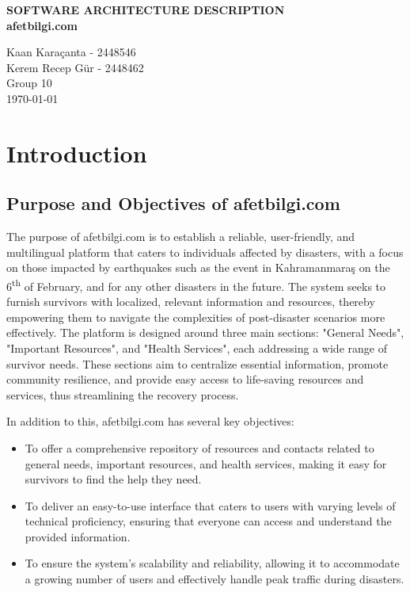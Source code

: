 \documentclass[12pt, letterpaper]{article}
\begin{document}
\begin{titlepage}
    \centering
    \vspace*{\fill}
    \huge
    \textbf{SOFTWARE ARCHITECTURE DESCRIPTION}\\
    \vspace{1cm}
    \textbf{afetbilgi.com}

    \vspace{1cm}
    \large
    Kaan Karaçanta - 2448546 \\
    Kerem Recep Gür - 2448462 \\
    \vspace{1cm}
    Group 10 \\
    \vspace{1cm}
    \today
    \vspace*{\fill}
\end{titlepage}

\tableofcontents
\newpage

\listoffigures
\newpage

\listoftables
\newpage

\section{Introduction}
\subsection{Purpose and Objectives of afetbilgi.com}
The purpose of afetbilgi.com is to establish a reliable, user-friendly, and multilingual platform that caters to individuals affected by disasters, with a focus on those impacted by earthquakes such as the event in Kahramanmaraş on the 6\textsuperscript{th} of February, and for any other disasters in the future. The system seeks to furnish survivors with localized, relevant information and resources, thereby empowering them to navigate the complexities of post-disaster scenarios more effectively.
The platform is designed around three main sections: "General Needs", "Important Resources", and "Health Services", each addressing a wide range of survivor needs. These sections aim to centralize essential information, promote community resilience, and provide easy access to life-saving resources and services, thus streamlining the recovery process.

In addition to this, afetbilgi.com has several key objectives:

\begin{itemize}
    \item To offer a comprehensive repository of resources and contacts related to general needs, important resources, and health services, making it easy for survivors to find the help they need.
    \item To deliver an easy-to-use interface that caters to users with varying levels of technical proficiency, ensuring that everyone can access and understand the provided information.
    \item To ensure the system's scalability and reliability, allowing it to accommodate a growing number of users and effectively handle peak traffic during disasters.
\end{itemize}
\end{document}
